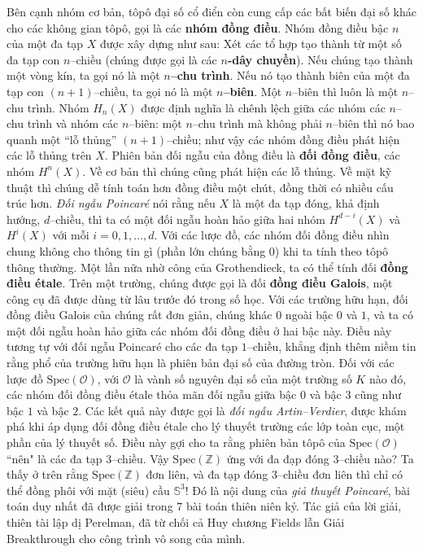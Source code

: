 \begin{multicols}{2}
	Bên cạnh nhóm cơ bản, tôpô đại số cổ điển còn cung cấp các bất biến đại số khác cho các không gian tôpô, gọi là các {\bf\color{duongvaotoanhoc} nhóm đồng điều}. Nhóm đồng điều bậc $n$ của một đa tạp $X$ được xây dựng như sau: Xét các tổ hợp tạo thành từ một số đa tạp con $n$--chiều (chúng được gọi là các {\bf\color{duongvaotoanhoc} $n$-dây chuyền}). Nếu chúng tạo thành một vòng kín, ta gọi nó là một {\bf\color{duongvaotoanhoc} $n$--chu trình}. Nếu nó tạo thành biên của một đa tạp con $(n+1)$--chiều, ta gọi nó là một {\bf\color{duongvaotoanhoc} $n$--biên}. Một $n$--biên thì luôn là một $n$--chu trình. Nhóm $H_n(X)$ được định nghĩa là chênh lệch giữa các nhóm các $n$--chu trình và nhóm các $n$--biên: một $n$--chu trình mà không phải $n$--biên thì nó bao quanh một ``lỗ thủng'' $(n+1)$--chiều; như vậy các nhóm đồng điều phát hiện các lỗ thủng trên $X$. Phiên bản đối ngẫu của đồng điều là {\bf\color{duongvaotoanhoc} đối đồng điều}, các nhóm $H^n(X)$. Về cơ bản thì chúng cũng phát hiện các lỗ thủng. Về mặt kỹ thuật thì chúng dễ tính toán hơn đồng điều một chút, đồng thời có nhiều cấu trúc hơn. {\it Đối ngẫu Poincaré} nói rằng nếu $X$ là một đa tạp đóng, khả định hướng, $d$--chiều, thì ta có một đối ngẫu hoàn hảo giữa hai nhóm $H^{d-i}(X)$ và $H^i(X)$ với mỗi $i = 0,1,\ldots,d$.
	\vskip 0.1cm
	Với các lược đồ, các nhóm đối đồng điều nhìn chung không cho thông tin gì (phần lớn chúng bằng $0$) khi ta tính theo tôpô thông thường. Một lần nữa nhờ công của Grothendieck, ta có thể tính đối {\bf\color{duongvaotoanhoc} đồng điều étale}.  Trên một trường, chúng được gọi là đối {\bf\color{duongvaotoanhoc} đồng điều Galois}, một công cụ đã được dùng từ lâu trước đó trong số học. Với các trường hữu hạn, đối đồng điều Galois của chúng rất đơn giản, chúng khác $0$ ngoài bậc $0$ và $1$, và ta có một đối ngẫu hoàn hảo giữa các nhóm đối đồng điều ở hai bậc này. Điều này tương tự với đối ngẫu Poincaré cho các đa tạp $1$--chiều, khẳng định thêm niềm tin rằng phổ của trường hữu hạn là phiên bản đại số của đường tròn. 
	\vskip 0.1cm
	Đối với các lược đồ $\text{Spec}(\mathcal{O})$, với $\mathcal{O}$ là vành số nguyên đại số của một trường số $K$ nào đó, các nhóm đối đồng điều étale thỏa mãn đối ngẫu giữa bậc $0$ và bậc $3$ cũng như bậc $1$ và bậc $2$. Các kết quả này được gọi là {\it đối ngẫu Artin--Verdier}, được khám phá khi áp dụng đối đồng điều étale cho lý thuyết trường các lớp toàn cục, một phần của lý thuyết số. Điều này gợi cho ta rằng phiên bản tôpô của $\text{Spec}(\mathcal{O})$ ``nên" là các đa tạp $3$--chiều. Vậy $\text{Spec}(\mathbb{Z})$ ứng với đa đạp đóng $3$--chiều nào? Ta thấy ở trên rằng $\text{Spec}(\mathbb{Z})$ đơn liên, và đa tạp đóng $3$--chiều đơn liên thì chỉ có thể đồng phôi với mặt (siêu) cầu  $\mathbb{S}^3$! Đó là nội dung của {\it giả thuyết Poincaré}, bài toán duy nhất đã được giải trong $7$ bài toán thiên niên kỷ. Tác giả của lời giải, thiên tài lập dị Perelman, đã từ chối cả Huy chương Fields lẫn Giải Breakthrough cho công trình vô song của mình.

\end{multicols}
